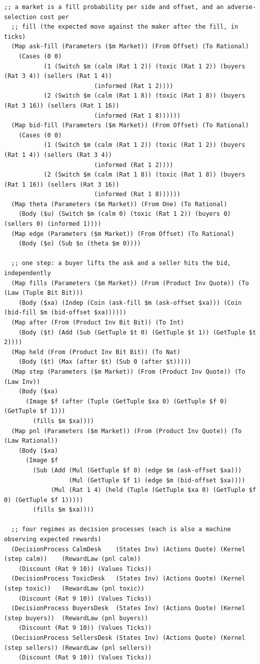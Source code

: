 \documentclass[11pt]{article}
\theoremstyle{definition}
\theoremstyle{plain}
\begin{document}
\begin{lstlisting}[style=mettafull]
  ;; a market is a fill probability per side and offset, and an adverse-selection cost per
  ;; fill (the expected move against the maker after the fill, in ticks)
  (Map ask-fill (Parameters ($m Market)) (From Offset) (To Rational)
    (Cases (0 0)
           (1 (Switch $m (calm (Rat 1 2)) (toxic (Rat 1 2)) (buyers (Rat 3 4)) (sellers (Rat 1 4))
                         (informed (Rat 1 2))))
           (2 (Switch $m (calm (Rat 1 8)) (toxic (Rat 1 8)) (buyers (Rat 3 16)) (sellers (Rat 1 16))
                         (informed (Rat 1 8))))))
  (Map bid-fill (Parameters ($m Market)) (From Offset) (To Rational)
    (Cases (0 0)
           (1 (Switch $m (calm (Rat 1 2)) (toxic (Rat 1 2)) (buyers (Rat 1 4)) (sellers (Rat 3 4))
                         (informed (Rat 1 2))))
           (2 (Switch $m (calm (Rat 1 8)) (toxic (Rat 1 8)) (buyers (Rat 1 16)) (sellers (Rat 3 16))
                         (informed (Rat 1 8))))))
  (Map theta (Parameters ($m Market)) (From One) (To Rational)
    (Body ($u) (Switch $m (calm 0) (toxic (Rat 1 2)) (buyers 0) (sellers 0) (informed 1))))
  (Map edge (Parameters ($m Market)) (From Offset) (To Rational)
    (Body ($o) (Sub $o (theta $m 0))))

  ;; one step: a buyer lifts the ask and a seller hits the bid, independently
  (Map fills (Parameters ($m Market)) (From (Product Inv Quote)) (To (Law (Tuple Bit Bit)))
    (Body ($xa) (Indep (Coin (ask-fill $m (ask-offset $xa))) (Coin (bid-fill $m (bid-offset $xa))))))
  (Map after (From (Product Inv Bit Bit)) (To Int)
    (Body ($t) (Add (Sub (GetTuple $t 0) (GetTuple $t 1)) (GetTuple $t 2))))
  (Map held (From (Product Inv Bit Bit)) (To Nat)
    (Body ($t) (Max (after $t) (Sub 0 (after $t)))))
  (Map step (Parameters ($m Market)) (From (Product Inv Quote)) (To (Law Inv))
    (Body ($xa)
      (Image $f (after (Tuple (GetTuple $xa 0) (GetTuple $f 0) (GetTuple $f 1)))
        (fills $m $xa))))
  (Map pnl (Parameters ($m Market)) (From (Product Inv Quote)) (To (Law Rational))
    (Body ($xa)
      (Image $f
        (Sub (Add (Mul (GetTuple $f 0) (edge $m (ask-offset $xa)))
                  (Mul (GetTuple $f 1) (edge $m (bid-offset $xa))))
             (Mul (Rat 1 4) (held (Tuple (GetTuple $xa 0) (GetTuple $f 0) (GetTuple $f 1)))))
        (fills $m $xa))))

  ;; four regimes as decision processes (each is also a machine observing expected rewards)
  (DecisionProcess CalmDesk    (States Inv) (Actions Quote) (Kernel (step calm))    (RewardLaw (pnl calm))
    (Discount (Rat 9 10)) (Values Ticks))
  (DecisionProcess ToxicDesk   (States Inv) (Actions Quote) (Kernel (step toxic))   (RewardLaw (pnl toxic))
    (Discount (Rat 9 10)) (Values Ticks))
  (DecisionProcess BuyersDesk  (States Inv) (Actions Quote) (Kernel (step buyers))  (RewardLaw (pnl buyers))
    (Discount (Rat 9 10)) (Values Ticks))
  (DecisionProcess SellersDesk (States Inv) (Actions Quote) (Kernel (step sellers)) (RewardLaw (pnl sellers))
    (Discount (Rat 9 10)) (Values Ticks))


\end{lstlisting}
\end{document}

